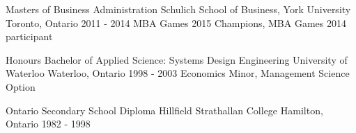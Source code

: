 

\begin{cventries}

\cventry
    {Masters of Business Administration} %
    {Schulich School of Business, York University} %
    {Toronto, Ontario} %
    {2011 - 2014} %
    {MBA Games 2015 Champions, MBA Games 2014 participant} 
    
\cventry
    {Honours Bachelor of Applied Science: Systems Design Engineering} %
    {University of Waterloo} %
    {Waterloo, Ontario} %
    {1998 - 2003} %
    {Economics Minor, Management Science Option}   

\cventryb
    {Ontario Secondary School Diploma} %
    {Hillfield Strathallan College} %
    {Hamilton, Ontario} %
    {1982 - 1998} %

\end{cventries}  